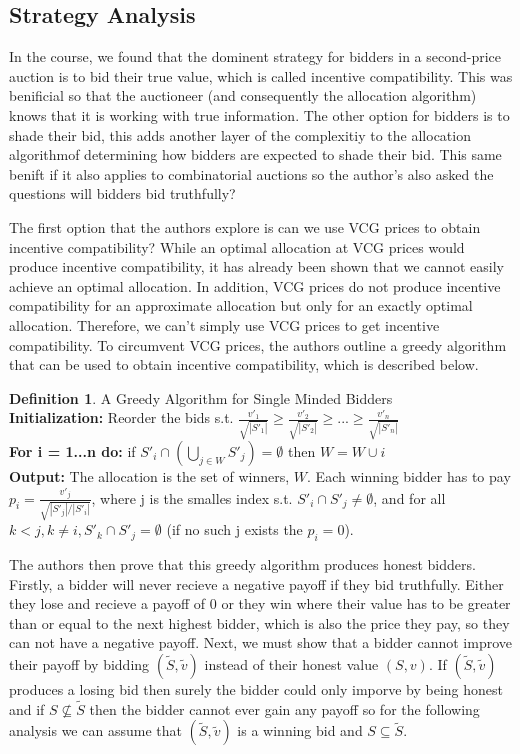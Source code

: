 \documentclass[10pt,onecolumn,letterpaper]{article}
\theoremstyle{definition}
\newtheorem{definition}{Definition}[section]
\begin{document}
\subsection{Strategy Analysis}

In the course, we found that the dominent strategy for bidders in a second-price auction is to bid their true value, which is called incentive compatibility. This was benificial so that the auctioneer (and consequently the allocation algorithm) knows that it is working with true information. The other option for bidders is to shade their bid, this adds another layer of the complexitiy to the allocation algorithmof determining how bidders are expected to shade their bid. This same benift if it also applies to combinatorial auctions so the author's also asked the questions will bidders bid truthfully?

The first option that the authors explore is can we use VCG prices to obtain incentive compatibility? While an optimal allocation at VCG prices would produce incentive compatibility, it has already been shown that we cannot easily achieve an optimal allocation. In addition, VCG prices do not produce incentive compatibility for an approximate allocation but only for an exactly optimal allocation. Therefore, we can't simply use VCG prices to get incentive compatibility. To circumvent VCG prices, the authors outline a greedy algorithm that can be used to obtain incentive compatibility, which is described below.

\theoremstyle{definition}
\begin{definition}{A Greedy Algorithm for Single Minded Bidders}
\\
\textbf{Initialization:} Reorder the bids s.t. $\frac{v'_1}{\sqrt{|S'_1|}} \geq \frac{v'_2}{\sqrt{|S'_2|}} \geq ... \geq \frac{v'_n}{\sqrt{|S'_n|}} $
\\
\textbf{For i = 1...n do:} if $S'_i \cap (\bigcup_{j \in W} S'_j) = \emptyset$ then $W = W \cup i$
\\
\textbf{Output:} The allocation is the set of winners, $W$. Each winning bidder has to pay $p_i = \frac{v'_j}{\sqrt{|S'_j|/|S'_i|}}$, where j is the smalles index s.t. $S'_i \cap S'_j \neq \emptyset$, and for all $k < j, k \neq i, S'_k \cap S'_j = \emptyset$ (if no such j exists the $p_i = 0$).  
\end{definition}

The authors then prove that this greedy algorithm produces honest bidders. Firstly, a bidder will never recieve a negative payoff if they bid truthfully. Either they lose and recieve a payoff of 0 or they win where their value has to be greater than or equal to the next highest bidder, which is also the price they pay, so they can not have a negative payoff. Next, we must show that a bidder cannot improve their payoff by bidding $(\tilde{S}, \tilde{v})$ instead of their honest value $(S,v)$. If $(\tilde{S}, \tilde{v})$ produces a losing bid then surely the bidder could only imporve by being honest and if $S \nsubseteq \tilde{S}$ then the bidder cannot ever gain any payoff so for the following analysis we can assume that $(\tilde{S}, \tilde{v})$ is a winning bid and $S \subseteq \tilde{S}$.
\end{document}
